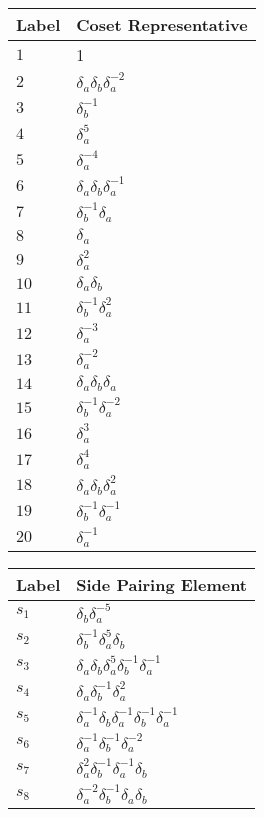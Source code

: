 \documentclass{article}
\begin{document}
\begin{center}
\begin{tabular}{ll}
\toprule
Label & Coset Representative\\
\midrule
$1$ & 1 \\
$2$ & $\delta_a^{}\delta_b^{}\delta_a^{-2}$ \\
$3$ & $\delta_b^{-1}$ \\
$4$ & $\delta_a^{5}$ \\
$5$ & $\delta_a^{-4}$ \\
$6$ & $\delta_a^{}\delta_b^{}\delta_a^{-1}$ \\
$7$ & $\delta_b^{-1}\delta_a^{}$ \\
$8$ & $\delta_a^{}$ \\
$9$ & $\delta_a^{2}$ \\
$10$ & $\delta_a^{}\delta_b^{}$ \\
$11$ & $\delta_b^{-1}\delta_a^{2}$ \\
$12$ & $\delta_a^{-3}$ \\
$13$ & $\delta_a^{-2}$ \\
$14$ & $\delta_a^{}\delta_b^{}\delta_a^{}$ \\
$15$ & $\delta_b^{-1}\delta_a^{-2}$ \\
$16$ & $\delta_a^{3}$ \\
$17$ & $\delta_a^{4}$ \\
$18$ & $\delta_a^{}\delta_b^{}\delta_a^{2}$ \\
$19$ & $\delta_b^{-1}\delta_a^{-1}$ \\
$20$ & $\delta_a^{-1}$ \\
\bottomrule
\end{tabular}
\hfill
\begin{tabular}{ll}
\toprule
Label & Side Pairing Element\\
\midrule
$s_{1}$ & $\delta_b^{}\delta_a^{-5}$ \\
$s_{2}$ & $\delta_b^{-1}\delta_a^{5}\delta_b^{}$ \\
$s_{3}$ & $\delta_a^{}\delta_b^{}\delta_a^{5}\delta_b^{-1}\delta_a^{-1}$ \\
$s_{4}$ & $\delta_a^{}\delta_b^{-1}\delta_a^{2}$ \\
$s_{5}$ & $\delta_a^{-1}\delta_b^{}\delta_a^{-1}\delta_b^{-1}\delta_a^{-1}$ \\
$s_{6}$ & $\delta_a^{-1}\delta_b^{-1}\delta_a^{-2}$ \\
$s_{7}$ & $\delta_a^{2}\delta_b^{-1}\delta_a^{-1}\delta_b^{}$ \\
$s_{8}$ & $\delta_a^{-2}\delta_b^{-1}\delta_a^{}\delta_b^{}$ \\

\end{tabular}
\end{center}
\end{document}
